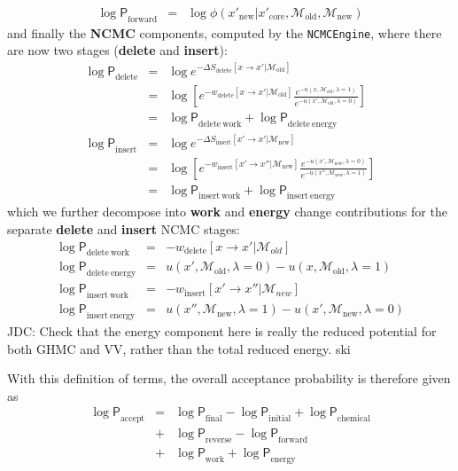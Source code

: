 \documentclass[aps,pre,twocolumn,nofootinbib,superscriptaddress,linenumbers,11point]{revtex4-1}
\newcommand{\logP}{{\log \mathsf{P}}}
\newcommand{\newmol}{{\mathcal{M}_\mathrm{new}}}
\newcommand{\oldmol}{{\mathcal{M}_\mathrm{old}}}
\begin{document}
\begin{itemize}
\begin{eqnarray}
\logP_\mathrm{forward} &=& \log \phi(x'_\mathrm{new} | x'_\mathrm{core}, \mathcal{M}_\mathrm{old}, \mathcal{M}_\mathrm{new})
\end{eqnarray}
and finally the {\bf NCMC} components, computed by the {\tt NCMCEngine}, where there are now two stages ({\bf delete} and {\bf insert}):
\begin{eqnarray}
\logP_\mathrm{delete} &=& \log e^{-\Delta S_\mathrm{delete}[x \rightarrow x' | \mathcal{M}_\mathrm{old}]}  \label{equation:two-stage-ncmc-delete} \\
&=& \log \left[ e^{-w_\mathrm{delete}[x \rightarrow x' | \mathcal{M}_\mathrm{old}]} \frac{e^{-u(x, \mathcal{M}_\mathrm{old}, \lambda=1)}}{e^{-u(x', \mathcal{M}_\mathrm{old}, \lambda=0)}} \right] \nonumber \\
&=& \logP_\mathrm{delete~work} + \logP_\mathrm{delete~energy} \\
\logP_\mathrm{insert} &=& \log e^{-\Delta S_\mathrm{insert}[x' \rightarrow x' | \mathcal{M}_\mathrm{new}]}  \label{equation:two-stage-ncmc-insert} \\
&=& \log \left[ e^{-w_\mathrm{insert}[x' \rightarrow x'' | \mathcal{M}_\mathrm{new}]} \frac{e^{-u(x', \mathcal{M}_\mathrm{new}, \lambda=0)}}{e^{-u(x'', \mathcal{M}_\mathrm{new}, \lambda=1)}} \right] \nonumber \\
&=& \logP_\mathrm{insert~work} + \logP_\mathrm{insert~energy}
\end{eqnarray}
which we further decompose into {\bf work} and {\bf energy} change contributions for the separate {\bf delete} and {\bf insert} NCMC stages:
\begin{eqnarray}
\logP_\mathrm{delete~work} &=& -w_\mathrm{delete}[x \rightarrow x' | \mathcal{M}_{old}] \\
\logP_\mathrm{delete~energy} &=& u(x', \oldmol, \lambda=0) - u(x, \oldmol, \lambda=1) \nonumber \\
\logP_\mathrm{insert~work} &=& -w_\mathrm{insert}[x' \rightarrow x'' | \mathcal{M}_{new}] \\
\logP_\mathrm{insert~energy} &=& u(x'', \newmol, \lambda=1) - u(x', \newmol, \lambda=0) \nonumber
\end{eqnarray}
{\color{red} JDC: Check that the energy component here is really the reduced potential for both GHMC and VV, rather than the total reduced energy.}
ski
\end{itemize}
With this definition of terms, the overall acceptance probability is therefore given as
\begin{eqnarray}
\logP_\mathrm{accept} &=& \logP_\mathrm{final} - \logP_\mathrm{initial} + \logP_\mathrm{chemical} \nonumber \\
&+& \logP_\mathrm{reverse} - \logP_\mathrm{forward} \nonumber \\
&+& \logP_\mathrm{work} + \logP_\mathrm{energy}
\end{eqnarray}
\end{document}
